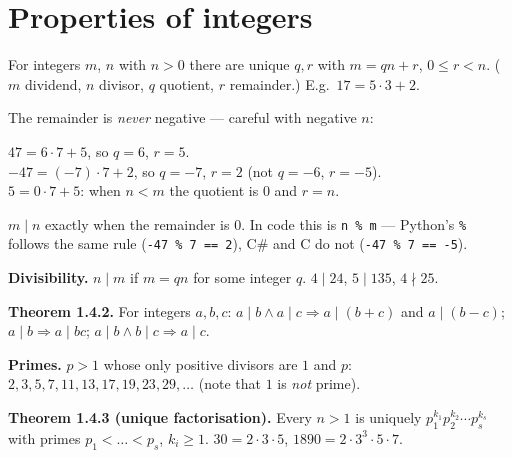 \documentclass{fkt-notes}
\newcommand{\src}[1]{\par\noindent{\small\itshape Source: #1}\par\smallskip}
\newcommand{\kolman}[1]{\setcounter{section}{\numexpr#1-1\relax}}
\theoremstyle{definition}
\begin{document}
\kolman{4}
\section{Properties of integers}\src{Kolman 1.4}
%

\begin{rulebox}[title=Theorem 1.4.1 (division with remainder)]
  For integers $m$, $n$ with $n>0$ there are unique $q,r$ with
  $m=qn+r$, $0\le r<n$. ($m$ dividend, $n$ divisor, $q$ quotient,
  $r$ remainder.) \quad E.g.\ $17=5\cdot3+2$.
\end{rulebox}

%
The remainder is \emph{never} negative --- careful with negative $n$:

\begin{example}
  $47 = 6 \cdot 7 + 5$, so $q = 6$, $r = 5$.\\
  $-47 = (-7) \cdot 7 + 2$, so $q = -7$, $r = 2$ (not $q = -6$, $r = -5$).\\
  $5 = 0 \cdot 7 + 5$: when $n < m$ the quotient is $0$ and $r = n$.
\end{example}

\noindent $m \mid n$ exactly when the remainder is $0$. In code this is
\texttt{n \% m} --- Python's \texttt{\%} follows the same rule
(\texttt{-47 \% 7 == 2}), C\# and C do not (\texttt{-47 \% 7 == -5}).

\textbf{Divisibility.} $n\mid m$ if $m=qn$ for some integer $q$.
$4\mid24$, $5\mid135$, $4\nmid25$.

\begin{rulepar}
  \textbf{Theorem 1.4.2.} For integers $a,b,c$:
  $a\mid b \wedge a\mid c\Rightarrow a\mid(b+c)$ and $a\mid(b-c)$;\;
  $a\mid b\Rightarrow a\mid bc$;\;
  $a\mid b\wedge b\mid c\Rightarrow a\mid c$.
\end{rulepar}

\textbf{Primes.} $p>1$ whose only positive divisors are $1$ and $p$:
$2,3,5,7,11,13,17,19,23,29,\dots$ (note that $1$ is \emph{not} prime).

\begin{rulepar}
  \textbf{Theorem 1.4.3 (unique factorisation).} Every $n>1$ is uniquely
  $p_1^{k_1}p_2^{k_2}\cdots p_s^{k_s}$ with primes $p_1<\dots<p_s$, $k_i\ge1$.
  \quad $30=2\cdot3\cdot5$, \quad $1890=2\cdot3^3\cdot5\cdot7$.
\end{rulepar}
\end{document}
